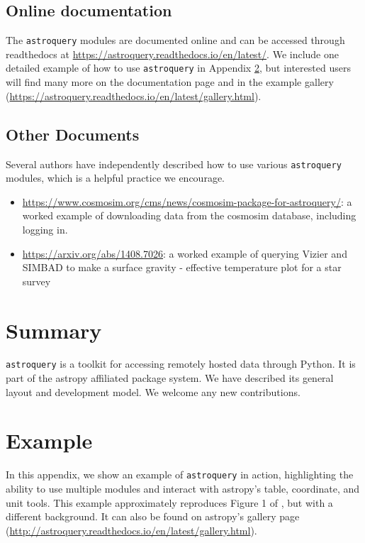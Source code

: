 \documentclass[twocolumn]{aastex61}
\newcommand{\package}[1]{\texttt{#1}\xspace}
\newcommand{\astroquery}{\package{astroquery}}
\begin{document}
\subsection{Online documentation}
The \astroquery modules are documented online and can be accessed through
readthedocs at \url{https://astroquery.readthedocs.io/en/latest/}.
We include one detailed example of how to use \astroquery in Appendix \ref{sec:example},
but interested users will find many more on the documentation page and
in the example gallery (\url{https://astroquery.readthedocs.io/en/latest/gallery.html}).

\subsection{Other Documents}
Several authors have independently described how to use various \astroquery
modules, which is a helpful practice we encourage.

\begin{itemize}
    \item
        \url{https://www.cosmosim.org/cms/news/cosmosim-package-for-astroquery/}:
        a worked example of downloading data from the cosmosim database,
        including logging in.
    \item \url{https://arxiv.org/abs/1408.7026}: a worked example of querying
        Vizier and SIMBAD to make a surface gravity - effective temperature
        plot for a star survey
\end{itemize}

\section{Summary}
\astroquery is a toolkit for accessing remotely hosted data through Python.
It is part of the astropy affiliated package system.
We have described its general layout and development model.
We welcome any new contributions.





\appendix
\section{Example}
\label{sec:example}
In this appendix, we show an example of \astroquery in action, highlighting the
ability to use multiple modules and interact with astropy's table, coordinate,
and unit tools.  This example approximately reproduces Figure 1 of
\citet{Eisner2016a}, but with a different background.
It can also be found on astropy's gallery page (\url{http://astroquery.readthedocs.io/en/latest/gallery.html}).
\end{document}
